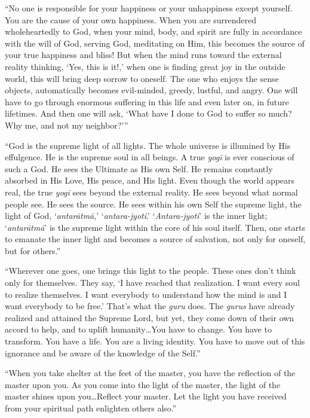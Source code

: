 \documentclass[12pt, twoside, openright]{memoir}
\begin{document}
\enquote{No one is responsible for your happiness or your unhappiness except yourself. You are the cause of your own happiness. When you are surrendered wholeheartedly to God, when your mind, body, and spirit are fully in accordance with the will of God, serving God, meditating on Him, this becomes the source of your true happiness and bliss! But when the mind runs toward the external reality thinking, \enquote{Yes, this is it!,} when one is finding great joy in the outside world, this will bring deep sorrow to oneself. The one who enjoys the sense objects, automatically becomes evil-minded, greedy, lustful, and angry. One will have to go through enormous suffering in this life and even later on, in future lifetimes. And then one will ask, \enquote{What have I done to God to suffer so much? Why me, and not my neighbor?}}

\enquote{God is the supreme light of all lights. The whole universe is illumined by His effulgence. He is the supreme soul in all beings. A true \textit{yogī} is ever conscious of such a God. He sees the Ultimate as His own Self. He remains constantly absorbed in His Love, His peace, and His light. Even though the world appears real, the true \textit{yogī} sees beyond the external reality. He sees beyond what normal people see. He sees the source. He sees within his own Self the supreme light, the light of God, \enquote{\textit{antarātmā},} \enquote{\textit{antara-jyoti}.} \enquote{\textit{Antara-jyoti}} is the inner light; \enquote{\textit{antarātmā}} is the supreme light within the core of his soul itself. Then, one starts to emanate the inner light and becomes a source of salvation, not only for oneself, but for others.}

\enquote{Wherever one goes, one brings this light to the people. These ones don’t think only for themselves. They say, \enquote{I have reached that realization. I want every soul to realize themselves. I want everybody to understand how the mind is and I want everybody to be free.} That’s what the \textit{guru} does. The \textit{gurus} have already realized and attained the Supreme Lord, but yet, they come down of their own accord to help, and to uplift humanity\ldots You have to change. You have to transform. You have a life. You are a living identity. You have to move out of this ignorance and be aware of the knowledge of the Self.}

\enquote{When you take shelter at the feet of the master, you have the reflection of the master upon you. As you come into the light of the master, the light of the master shines upon you\ldots Reflect your master. Let the light you have received from your spiritual path enlighten others also.}
\end{document}
